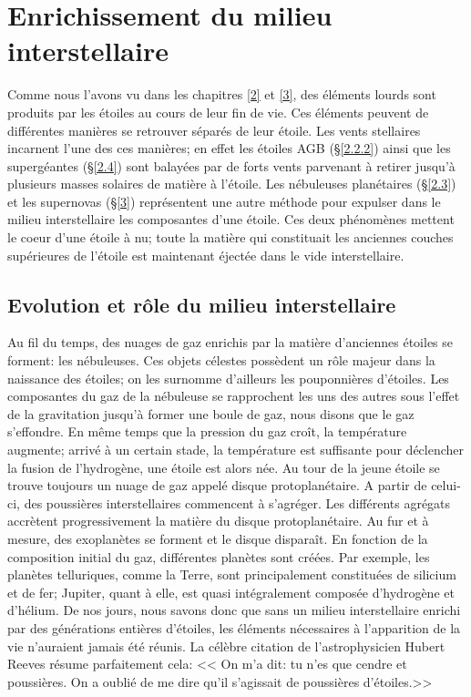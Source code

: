
\chapterFormatfive

\chapter{Enrichissement du milieu interstellaire}\label{5}

\chapterFormat

Comme nous l'avons vu dans les chapitres \ref{2} et \ref{3}, des éléments lourds sont produits par les étoiles au cours de leur fin de vie. Ces éléments peuvent de différentes manières se retrouver séparés de leur étoile. Les vents stellaires incarnent l'une des ces manières; en effet les étoiles AGB (§\ref{2.2.2}) ainsi que les supergéantes (§\ref{2.4}) sont balayées par de forts vents parvenant à retirer jusqu'à plusieurs masses solaires de matière à l'étoile. Les nébuleuses planétaires (§\ref{2.3}) et les supernovas (§\ref{3}) représentent une autre méthode pour expulser dans le milieu interstellaire les composantes d'une étoile. Ces deux phénomènes mettent le coeur d'une étoile à nu; toute la matière qui constituait les anciennes couches supérieures de l'étoile est maintenant éjectée dans le vide interstellaire. 

\section{Evolution et rôle du milieu interstellaire}\label{5.1}

Au fil du temps, des nuages de gaz enrichis par la matière d'anciennes étoiles se forment: les nébuleuses. Ces objets célestes possèdent un rôle majeur dans la naissance des étoiles; on les surnomme d'ailleurs les pouponnières d'étoiles. Les composantes du gaz de la nébuleuse se rapprochent les uns des autres sous l'effet de la gravitation jusqu'à former une boule de gaz, nous disons que le gaz s'effondre. En même temps que la pression du gaz croît, la température augmente; arrivé à un certain stade, la température est suffisante pour déclencher la fusion de l'hydrogène, une étoile est alors née. Au tour de la jeune étoile se trouve toujours un nuage de gaz appelé disque protoplanétaire. A partir de celui-ci, des poussières interstellaires commencent à s'agréger. Les différents agrégats accrètent progressivement la matière du disque protoplanétaire. Au fur et à mesure, des exoplanètes se forment et le disque disparaît. En fonction de la composition initial du gaz, différentes planètes sont créées. Par exemple, les planètes telluriques, comme la Terre, sont principalement constituées de silicium et de fer; Jupiter, quant à elle, est quasi intégralement composée d'hydrogène et d'hélium. De nos jours, nous savons donc que sans un milieu interstellaire enrichi par des générations entières d'étoiles, les éléments nécessaires à l'apparition de la vie n'auraient jamais été réunis. La célèbre citation de l'astrophysicien Hubert Reeves résume parfaitement cela: << On m'a dit: tu n'es que cendre et poussières. On a oublié de me dire qu'il s'agissait de poussières d'étoiles.>>

